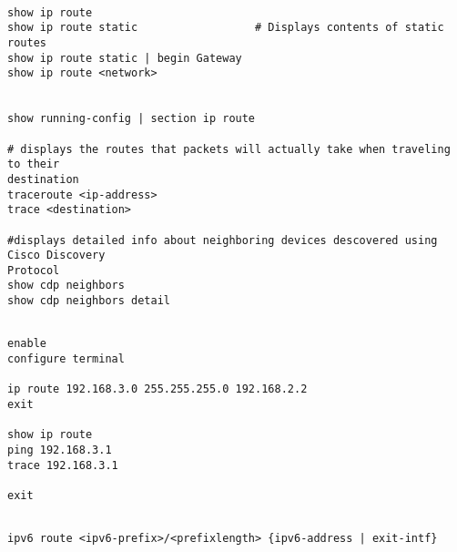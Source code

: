 \documentclass[../EngineeringJournal_CDavis.tex]{subfiles}
\begin{document}

\hspace{0.2cm}
\begin{tcolorbox}[width=6.3in]
\scriptsize
\begin{verbatim}

show ip route
show ip route static                  # Displays contents of static routes
show ip route static | begin Gateway
show ip route <network>


show running-config | section ip route

# displays the routes that packets will actually take when traveling to their
destination
traceroute <ip-address>
trace <destination>

#displays detailed info about neighboring devices descovered using Cisco Discovery
Protocol
show cdp neighbors
show cdp neighbors detail

\end{verbatim}
\normalsize
\end{tcolorbox}
\hspace{0.2cm}


\hspace{0.2cm}
\begin{tcolorbox}[width=6.3in]
\scriptsize
\begin{verbatim}

enable
configure terminal

ip route 192.168.3.0 255.255.255.0 192.168.2.2
exit

show ip route
ping 192.168.3.1
trace 192.168.3.1

exit

\end{verbatim}
\normalsize
\end{tcolorbox}
\hspace{0.2cm}


\hspace{0.2cm}
\begin{tcolorbox}[width=6.3in]
\scriptsize
\begin{verbatim}

ipv6 route <ipv6-prefix>/<prefixlength> {ipv6-address | exit-intf}


\end{verbatim}
\normalsize
\end{tcolorbox}
\hspace{0.2cm}
\end{document}
